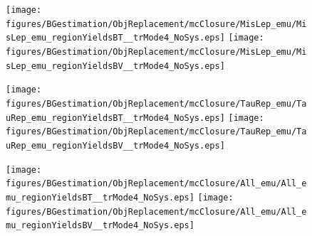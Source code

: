 \begin{figure}[htbp]
  \begin{center}
    \texttt{[image: figures/BGestimation/ObjReplacement/mcClosure/MisLep\_emu/MisLep\_emu\_regionYieldsBT\_\_trMode4\_NoSys.eps]}
    \label{fig::ObjReplace::mcClosure::MisLep_regionYieldsBT}
    \texttt{[image: figures/BGestimation/ObjReplacement/mcClosure/MisLep\_emu/MisLep\_emu\_regionYieldsBV\_\_trMode4\_NoSys.eps]}
    \label{fig::ObjReplace::mcClosure::MisLep_regionYieldsBV}
  \end{center}
\end{figure}
\begin{figure}[htbp]
  \begin{center}
    \texttt{[image: figures/BGestimation/ObjReplacement/mcClosure/TauRep\_emu/TauRep\_emu\_regionYieldsBT\_\_trMode4\_NoSys.eps]}
    \label{fig::ObjReplace::mcClosure::TauRep_regionYieldsBT}
    \texttt{[image: figures/BGestimation/ObjReplacement/mcClosure/TauRep\_emu/TauRep\_emu\_regionYieldsBV\_\_trMode4\_NoSys.eps]}
    \label{fig::ObjReplace::mcClosure::TauRep_regionYieldsBV}
  \end{center}
\end{figure}
\begin{figure}[htbp]
  \begin{center}
    \texttt{[image: figures/BGestimation/ObjReplacement/mcClosure/All\_emu/All\_emu\_regionYieldsBT\_\_trMode4\_NoSys.eps]}
    \label{fig::ObjReplace::mcClosure::MisLepTauRep_regionYieldsBT}
    \texttt{[image: figures/BGestimation/ObjReplacement/mcClosure/All\_emu/All\_emu\_regionYieldsBV\_\_trMode4\_NoSys.eps]}
    \label{fig::ObjReplace::mcClosure::MisLepTauRep_regionYieldsBV}
  \end{center}
\end{figure}

